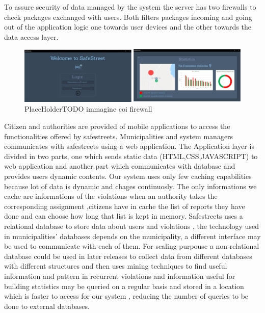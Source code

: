 To assure security of data managed by the system the server has two firewalls to check packages exchanged with users. Both filters packages incoming and going out of the application logic one towards user devices and the other towards the data access layer.
\begin{figure}[H]
\centering
\includegraphics[width=\textwidth]{Images/desktop_common_interface.png}
\caption{\label{fig:ComWI}PlaceHolderTODO immagine coi firewall}
\end{figure}
Citizen and authorities are provided of mobile applications to access the functionalities offered by safestreets. Municipalities and system managers communicates with safestreets using a web application.
The Application layer is divided in two parts, one which sends static data (HTML,CSS,JAVASCRIPT) to web application and another part which communicates with database and provides users dynamic contents.
Our system uses only few caching capabilities because lot of data is dynamic and chages continuosly. The only informations we cache are informations of the violations when an authority takes the corresponding assignment ,citizens have in cache the list of reports they have done and can choose how long that list is kept in memory.
Safestreets uses a relational database to store data about users and violations , the technology used in municipalities' databases depends on the municipality, a different interface may be used to communicate with each of them. For scaling purpouse a non relational database could be used in later releases to collect data from different databases with different structures and then uses mining techniques to find useful information and pattern in recurrent violations and information useful for building statistics may be queried on a regular basis and stored in a location which is faster to access for our system , reducing the number of queries to be done to external databases. 


